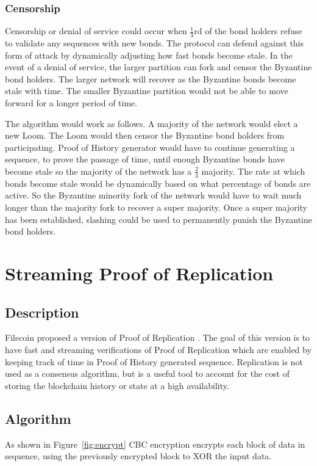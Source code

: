 \documentclass[12pt]{article}
\begin{document}
\subsubsection{Censorship}\label{censorship}
Censorship or denial of service could occur when \(\frac{1}{3}\)rd of the bond holders refuse to validate any sequences with new bonds. The protocol can defend against this form of attack by dynamically adjusting how fast bonds become stale. In the event of a denial of service, the larger partition can fork and censor the Byzantine bond holders. The larger network will recover as the Byzantine bonds become stale with time. The smaller Byzantine partition would not be able to move forward for a longer period of time. 

The algorithm would work as follows.  A majority of the network would elect a new Loom.  The Loom would then censor the Byzantine bond holders from participating.  Proof of History generator would have to continue generating a sequence, to prove the passage of time, until enough Byzantine bonds have become stale so the majority of the network has a \(\frac{2}{3}\) majority.  The rate at which bonds become stale would be dynamically based on what percentage of bonds are active.  So the Byzantine minority fork of the network would have to wait much longer than the majority fork to recover a super majority.  Once a super majority has been established, slashing could be used to permanently punish the Byzantine bond holders.

\section{Streaming Proof of Replication}\label{porep}
\subsection{Description}
Filecoin proposed a version of Proof of Replication \cite{filecoinporep}. The goal of this version is to have fast and streaming verifications of Proof of Replication which are enabled by keeping track of time in Proof of History generated sequence. Replication is not used as a consensus algorithm, but is a useful tool to account for the cost of storing the blockchain history or state at a high availability.
\subsection{Algorithm}
As shown in Figure~\ref{fig:encrypt} CBC encryption encrypts each block of data in sequence, using the previously encrypted block to XOR the input data.
\end{document}
